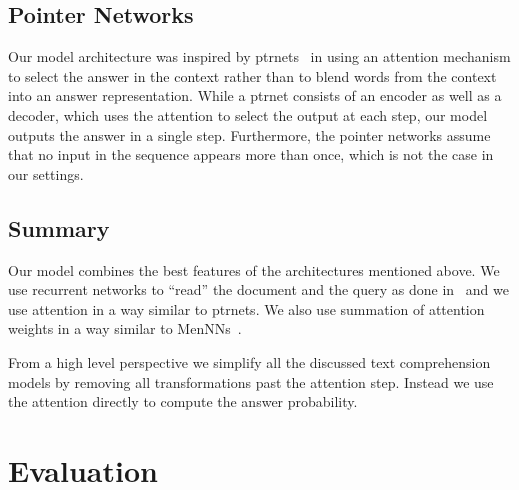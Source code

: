 \documentclass[11pt]{article}
\newcommand{\RUDAA}[1]{{\color{black}#1}}
\begin{document}
{\subsection{Pointer Networks}
Our model architecture was inspired by \glspl{ptrnet}~\cite{vinyals2015pointer} in using an attention mechanism to select the answer in the context rather than to blend words from the context into an answer representation.
While a \gls{ptrnet} consists of an encoder as well as a decoder, which uses the attention to select the output at each step, our model outputs the answer in a single step.
Furthermore, the pointer networks assume that no input in the sequence appears more than once, which is not the case in our settings.
}





\subsection{Summary}
Our model combines the best features of the architectures mentioned above. 
We use recurrent networks to ``read'' the document and the query as 
\RUDAA{
done in~\cite{hermann2015teaching,chen2016thorough,Kobayashi2016}
}
and we use attention in a way similar to \glspl{ptrnet}. 
We also use summation of attention weights in a way similar to \glspl{MenNN}~\cite{hill2015goldilocks}.

\RUDAA{
From a high level perspective we simplify all the discussed text comprehension models by removing all transformations past the attention step. Instead we use the attention directly to compute the answer probability.
}






\section{Evaluation}
\end{document}
